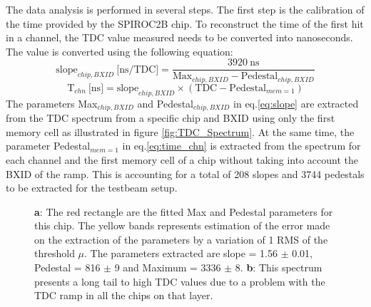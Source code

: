 \documentclass[twoside,a4paper,11pt]{article}
\begin{document}
The data analysis is performed in several steps. The first step is the calibration of the time provided by the SPIROC2B chip. To reconstruct the time of the first hit in a channel, the TDC value measured needs to be converted into nanoseconds. The value is converted using the following equation:
\begin{equation} \label{eq:slope}
 \text{slope}_{chip, BXID} \: \text{[ns/TDC]} = \frac{3920 \: \text{ns}}{\text{Max}_{chip, BXID} - \text{Pedestal}_{chip, BXID}}
\end{equation}
\begin{equation} \label{eq:time_chn}
\text{T}_{chn} \: \text{[ns]} = \text{slope}_{chip, BXID} \times (\text{TDC} - \text{Pedestal}_{mem=1} )
\end{equation}
The parameters Max$_{chip, BXID}$ and Pedestal$_{chip, BXID}$ in eq.\ref{eq:slope} are extracted from the TDC spectrum from a specific chip and BXID using only the first memory cell as illustrated in figure \ref{fig:TDC_Spectrum}. At the same time, the parameter Pedestal$_{mem=1}$ in eq.\ref{eq:time_chn} is extracted from the spectrum for each channel and the first memory cell of a chip without taking into account the BXID of the ramp. This is accounting for a total of 208 slopes and 3744 pedestals to be extracted for the testbeam setup.
\begin{figure}[htbp]
	\hfill
	\caption[]{\textbf{a}: The red rectangle are the fitted Max and Pedestal parameters for this chip. The yellow bands represents estimation of the error made on the extraction of the parameters by a variation of 1 RMS of the threshold $\mu$. The parameters extracted are slope = 1.56 $\pm$ 0.01, Pedestal = 816 $\pm$ 9 and Maximum = 3336 $\pm$ 8. \textbf{b}: This spectrum presents a long tail to high TDC values due to a problem with the TDC ramp in all the chips on that layer.}
\end{figure}
\end{document}
